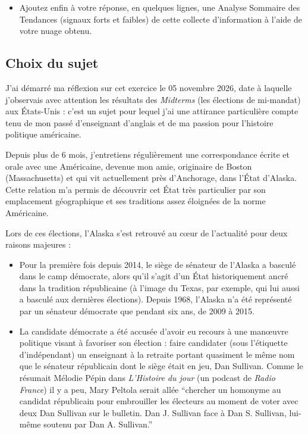 \begin{tcb-instructions}[title=Exercice 1.1]
\begin{itemize}[label=\checkmark]
        \item Ajoutez enfin à votre réponse, en quelques lignes, une Analyse Sommaire des Tendances (signaux forts et faibles) de cette collecte d’information à l’aide de votre nuage obtenu.

    \end{itemize}
\end{tcb-instructions}

\subsection{Choix du sujet}
J'ai démarré ma réflexion sur cet exercice le 05 novembre 2026, date à laquelle j'observais avec attention les résultats des \textit{Midterms} (les élections de mi-mandat) aux États-Unis : c'est un sujet pour lequel j'ai une attirance particulière compte tenu de mon passé d'enseignant d'anglais et de ma passion pour l'histoire politique américaine.

Depuis plus de 6 mois, j'entretiens régulièrement une correspondance écrite et orale avec une Américaine, devenue mon amie, originaire de Boston (Massachusetts) et qui vit actuellement près d'Anchorage, dans l'État d'Alaska. Cette relation m'a permis de découvrir cet État très particulier par son emplacement géographique et ses traditions assez éloignées de la norme Américaine.

Lors de ces élections, l'Alaska s'est retrouvé au cœur de l'actualité pour deux raisons majeures :
    \begin{itemize}
        \item Pour la première fois depuis 2014, le siège de sénateur de l'Alaska a basculé dans le camp démocrate, alors qu'il s'agit d'un État historiquement ancré dans la tradition républicaine (à l'image du Texas, par exemple, qui lui aussi a basculé aux dernières élections). Depuis 1968, l'Alaska n'a été représenté par un sénateur démocrate que pendant six ans, de 2009 à 2015.
        \item La candidate démocrate a été accusée d'avoir eu recours à une manœuvre politique visant à favoriser son élection : faire candidater (sous l'étiquette d'indépendant) un enseignant à la retraite portant quasiment le même nom que le sénateur républicain dont le siège était en jeu, Dan Sullivan. Comme le résumait Mélodie Pépin dans \textit{L'Histoire du jour} (un podcast de \textit{Radio France}) il y a peu, Mary Peltola serait allée \enquote{chercher un homonyme au candidat républicain pour embrouiller les électeurs au moment de voter avec deux Dan Sullivan sur le bulletin. Dan J. Sullivan face à Dan S. Sullivan, lui-même soutenu par Dan A. Sullivan.}\autocite{rf-hdj}
    \end{itemize}

